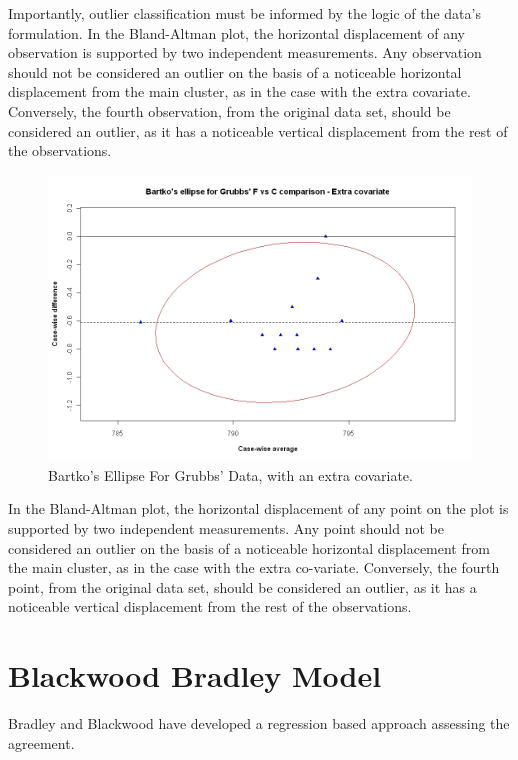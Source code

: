 \documentclass[12pt, a4paper]{report}
\theoremstyle{plain}
\theoremstyle{definition}
\theoremstyle{remark}
\begin{document}
	
	Importantly, outlier classification must be informed by the logic of the
	data's formulation. In the Bland-Altman plot, the horizontal displacement of any
	observation is supported by two independent measurements. Any
	observation should not be considered an outlier on the basis of a
	noticeable horizontal displacement from the main cluster, as in
	the case with the extra covariate. Conversely, the fourth
	observation, from the original data set, should be considered an
	outlier, as it has a noticeable vertical displacement from the
	rest of the observations.
	\newpage
	
	\begin{figure}[h!]
		\includegraphics[width=130mm]{images/GrubbsBartko2.jpeg}
		\caption{Bartko's Ellipse For Grubbs' Data, with an extra covariate.}\label{GrubbsBartko2}
	\end{figure}
	
	In the Bland-Altman plot, the horizontal displacement of any point on the plot is supported by two independent measurements. Any point should not be considered an outlier on the basis of a noticeable horizontal displacement from the main cluster, as in the case with the extra co-variate. Conversely, the fourth point, from the original data set, should be considered an
	outlier, as it has a noticeable vertical displacement from the rest of the observations.
	\newpage
	


	
	\section{Blackwood Bradley Model} 
	
	Bradley and Blackwood have developed a regression based approach
	assessing the agreement.
	
\end{document}
